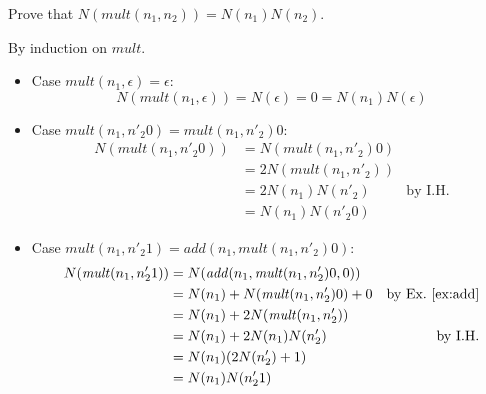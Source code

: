 \documentclass{tufte-handout}
\begin{document}
\begin{Exercise}
\label{ex:mult}
Prove that $N(\mathit{mult}(n_1,n_2)) = N(n_1) N(n_2)$.
\end{Exercise}
\begin{Answer}
By induction on $\mathit{mult}$.
\begin{itemize}
\item Case $\mathit{mult}(n_1,\epsilon) = \epsilon$:\\
  \[
  N(\mathit{mult}(n_1,\epsilon)) = N(\epsilon) = 0 
  = N(n_1) N(\epsilon)
  \]

\item Case $\mathit{mult}(n_1, n'_2 0) = \mathit{mult}(n_1,n'_2) 0$:
  \begin{align*}
    N(\mathit{mult}(n_1, n'_2 0)) &= N(\mathit{mult}(n_1,n'_2) 0) \\
     & = 2 N(\mathit{mult}(n_1,n'_2)) \\
     & = 2 N(n_1) N(n'_2) & \text{by I.H.}\\
     & = N(n_1) N (n'_2 0)
  \end{align*}

\item Case $\mathit{mult}(n_1, n'_2 1) = 
  \mathit{add}(n_1, \mathit{mult}(n_1,n'_2)0)$:
  \begin{align*}
    N(\mathit{mult}(n_1, n'_2 1)) &= 
    N(\mathit{add}(n_1, \mathit{mult}(n_1,n'_2)0, 0)) \\
    &= N(n_1) + N(\mathit{mult}(n_1,n'_2)0) + 0 & \text{by Ex.~\ref{ex:add}}\\
    &= N(n_1) + 2 N(\mathit{mult}(n_1,n'_2)) \\
    &= N(n_1) + 2 N(n_1) N(n'_2) & \text{by I.H.}\\
    &= N(n_1) (2 N(n'_2) + 1) \\
    &= N(n_1) N(n'_2 1)
  \end{align*}
\end{itemize}
\end{Answer}
\end{document}
